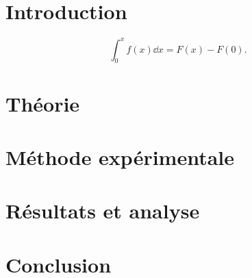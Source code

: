 \documentclass[a4paper, 11pt,twoside=true]{scrartcl} %
\begin{document}

\maketitle

\tableofcontents %
\newpage


\section{Introduction}
\[
\int_0^x f(x)\dd{x}=F(x)-F(0).
\]
\section{Théorie}
\section{Méthode expérimentale}
\section{Résultats et analyse}
\section{Conclusion}



\begin{thebibliography}{widest entry}


\end{thebibliography}	



\end{document}

